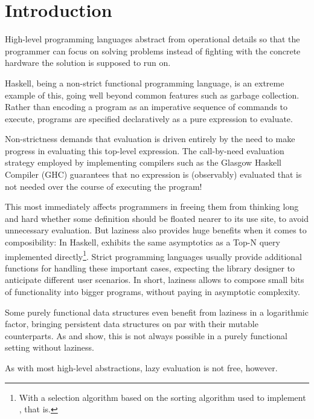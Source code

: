 \chapter{Introduction}\label{sec:intro}

High-level programming languages abstract from operational details so that the programmer can focus on solving problems instead of fighting with the concrete hardware the solution is supposed to run on.

Haskell, being a non-strict functional programming language, is an extreme example of this, going well beyond common features such as garbage collection.
Rather than encoding a program as an imperative sequence of commands to execute, programs are specified declaratively as a pure expression to evaluate.

Non-strictness demands that evaluation is driven entirely by the need to make progress in evaluating this top-level expression.
The call-by-need evaluation strategy employed by implementing compilers such as the Glasgow Haskell Compiler (GHC) guarantees that no expression is (observably) evaluated that is not needed over the course of executing the program!

This most immediately affects programmers in freeing them from thinking long and hard whether some definition should be floated nearer to its use site, to avoid unnecessary evaluation.
But laziness also provides huge benefits when it comes to composibility:
In Haskell,  exhibits the same asymptotics as a Top-N query implemented directly\footnote{With a selection algorithm based on the sorting algorithm used to implement , that is.}. 
Strict programming languages usually provide additional functions for handling these important cases, expecting the library designer to anticipate different user scenarios.
In short, laziness allows to compose small bits of functionality into bigger programs, without paying in asymptotic complexity.

Some purely functional data structures even benefit from laziness in a logarithmic factor, bringing persistent data structures on par with their mutable counterparts.
As \textcite{pippenger} and \textcite{bird} show, this is not always possible in a purely functional setting without laziness.

As with most high-level abstractions, lazy evaluation is not free, however.

